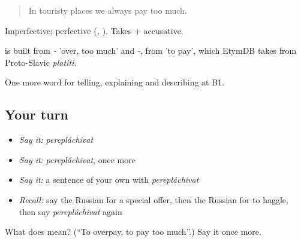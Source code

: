 \begin{quote}
In touristy places we always pay too much.
\end{quote}

Imperfective; perfective \emph{} (\emph{, }). Takes \emph{} + accusative.

\begin{cousinweb}
\emph{} is built from \emph{-} 'over, too much' and \emph{-}, from \emph{} 'to pay', which EtymDB takes from Proto-Slavic \emph{platiti}.
\end{cousinweb}

\begin{grammarlens}[title={What you've built}]
One more word for telling, explaining and describing at B1.
\end{grammarlens}

\subsection*{Your turn}
\begin{itemize}
\raggedright
  \item \emph{Say it:} \emph{perepláchivat}
  \item \emph{Say it:} \emph{perepláchivat}, once more
  \item \emph{Say it:} a sentence of your own with \emph{perepláchivat}
  \item \emph{Recall:} say the Russian for a special offer, then the Russian for to haggle, then say \emph{perepláchivat} again
\end{itemize}

\begin{tcolorbox}[breakable,colback=teal!4,colframe=teal!35!black,title={Before you move on}]
What does  mean? (\textquotedblleft{}To overpay, to pay too much\textquotedblright{}.) Say it once more.
\end{tcolorbox}
